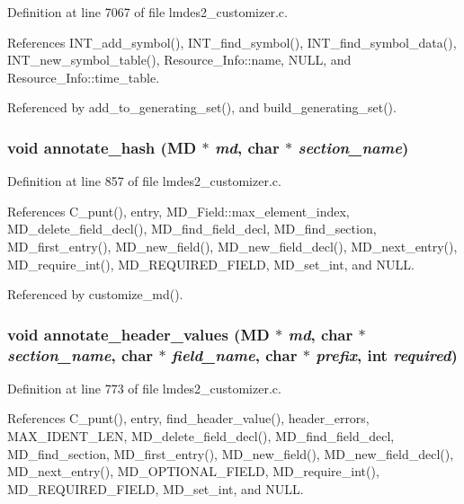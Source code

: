 Definition at line 7067 of file lmdes2\_\-customizer.c.

References INT\_\-add\_\-symbol(), INT\_\-find\_\-symbol(), INT\_\-find\_\-symbol\_\-data(), INT\_\-new\_\-symbol\_\-table(), Resource\_\-Info::name, NULL, and Resource\_\-Info::time\_\-table.

Referenced by add\_\-to\_\-generating\_\-set(), and build\_\-generating\_\-set().
\subsubsection{\setlength{\rightskip}{0pt plus 5cm}void annotate\_\-hash (\bf{MD} $\ast$ {\em md}, char $\ast$ {\em section\_\-name})}\label{lmdes2__customizer_8c_9269b069890aaa0c3eadf5b9e64e2a72}




Definition at line 857 of file lmdes2\_\-customizer.c.

References C\_\-punt(), entry, MD\_\-Field::max\_\-element\_\-index, MD\_\-delete\_\-field\_\-decl(), MD\_\-find\_\-field\_\-decl, MD\_\-find\_\-section, MD\_\-first\_\-entry(), MD\_\-new\_\-field(), MD\_\-new\_\-field\_\-decl(), MD\_\-next\_\-entry(), MD\_\-require\_\-int(), MD\_\-REQUIRED\_\-FIELD, MD\_\-set\_\-int, and NULL.

Referenced by customize\_\-md().
\subsubsection{\setlength{\rightskip}{0pt plus 5cm}void annotate\_\-header\_\-values (\bf{MD} $\ast$ {\em md}, char $\ast$ {\em section\_\-name}, char $\ast$ {\em field\_\-name}, char $\ast$ {\em prefix}, int {\em required})}\label{lmdes2__customizer_8c_66d922d9b46761dde0bd9e8d03168a2a}




Definition at line 773 of file lmdes2\_\-customizer.c.

References C\_\-punt(), entry, find\_\-header\_\-value(), header\_\-errors, MAX\_\-IDENT\_\-LEN, MD\_\-delete\_\-field\_\-decl(), MD\_\-find\_\-field\_\-decl, MD\_\-find\_\-section, MD\_\-first\_\-entry(), MD\_\-new\_\-field(), MD\_\-new\_\-field\_\-decl(), MD\_\-next\_\-entry(), MD\_\-OPTIONAL\_\-FIELD, MD\_\-require\_\-int(), MD\_\-REQUIRED\_\-FIELD, MD\_\-set\_\-int, and NULL.

